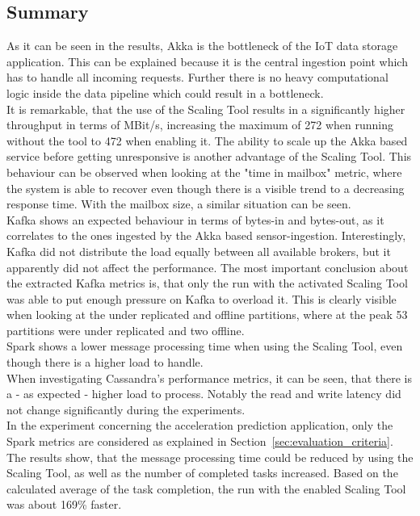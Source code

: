 \subsection{Summary}
As it can be seen in the results, Akka is the bottleneck of the IoT data storage application.
This can be explained because it is the central ingestion point which has to handle all incoming requests.
Further there is no heavy computational logic inside the data pipeline which could result in a bottleneck.\\
It is remarkable, that the use of the Scaling Tool results in a significantly higher throughput in terms of MBit/s, increasing the maximum of 272 when running without the tool to 472 when enabling it.
The ability to scale up the Akka based service before getting unresponsive is another advantage of the Scaling Tool.
This behaviour can be observed when looking at the "time in mailbox" metric, where the system is able to recover even though there is a visible trend to a decreasing response time.
With the mailbox size, a similar situation can be seen.\\
Kafka shows an expected behaviour in terms of bytes-in and bytes-out, as it correlates to the ones ingested by the Akka based sensor-ingestion.
Interestingly, Kafka did not distribute the load equally between all available brokers, but it apparently did not affect the performance.
The most important conclusion about the extracted Kafka metrics is, that only the run with the activated Scaling Tool was able to put enough pressure on Kafka to overload it.
This is clearly visible when looking at the under replicated and offline partitions, where at the peak 53 partitions were under replicated and two offline.\\
Spark shows a lower message processing time when using the Scaling Tool, even though there is a higher load to handle.\\
When investigating Cassandra's performance metrics, it can be seen, that there is a - as expected - higher load to process.
Notably the read and write latency did not change significantly during the experiments.\\

In the experiment concerning the acceleration prediction application, only the Spark metrics are considered as explained in Section~\ref{sec:evaluation_criteria}.
The results show, that the message processing time could be reduced by using the Scaling Tool, as well as the number of completed tasks increased.
Based on the calculated average of the task completion, the run with the enabled Scaling Tool was about 169\% faster.



